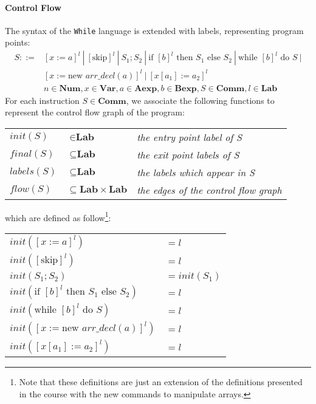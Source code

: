 \documentclass{article}
\begin{document}
\paragraph{Control Flow}
The syntax of the \texttt{While} language is extended with labels, representing program points:
\begin{equation*} \label{eq1}
\begin{split}
S::= & [x := a]^l
     \ |\ [\text{skip}]^l
     \ |\ S_1;S_2
     \ |\ \text{if } [b]^l \text{ then } S_1 \text{ else } S_2 
     \ |\ \text{while } [b]^l \text{ do } S \ |\\
     & [x := \text{new } arr\_decl(a)]^l
     \ |\ [x[a_1] := a_2]^l\\
& n \in \textbf{Num}, x \in \textbf{Var}, a \in \textbf{Aexp}, b \in \textbf{Bexp}, S \in \textbf{Comm}, l \in \textbf{Lab}
\end{split}
\end{equation*}
For each instruction \(S \in \textbf{Comm}\), we associate the following functions to represent the control flow graph of the program:
\begin{center}
\begin{tabular}{ l l l }
\(init(S)\) & \(\in \textbf{Lab}\) &  \textit{the entry point label of S}\\
\(final(S)\) & \(\subseteq \textbf{Lab}\) &  \textit{the exit point labels of S}\\
\(labels(S)\) & \(\subseteq \textbf{Lab}\) &  \textit{the labels which appear in S}\\
\(flow(S)\) & \(\subseteq \textbf{Lab} \times \textbf{Lab}\) &  \textit{the edges of the control flow graph}
\end{tabular}
\end{center}
which are defined as follow\footnote{Note that these definitions are just an extension of the definitions presented in the course with the new commands to manipulate arrays.}:
\begin{center}
\begin{tabular}{ l l }
\( init([x := a]^l) \)                                           & \( = l\)\\
\( init([\text{skip}]^l) \)                                      & \( = l\)\\
\( init(S_1;S_2) \)                                              & \( = init(S_1)\)\\
\( init(\text{if } [b]^l \text{ then } S_1 \text{ else } S_2) \) & \( = l\)\\
\( init(\text{while } [b]^l \text{ do } S) \)                    & \( = l\)\\
\( init([x := \text{new } arr\_decl(a)]^l) \)                    & \( = l\)\\
\( init([x[a_1] := a_2]^l) \)                                    & \( = l\)
\end{tabular}
\end{center}
\end{document}
